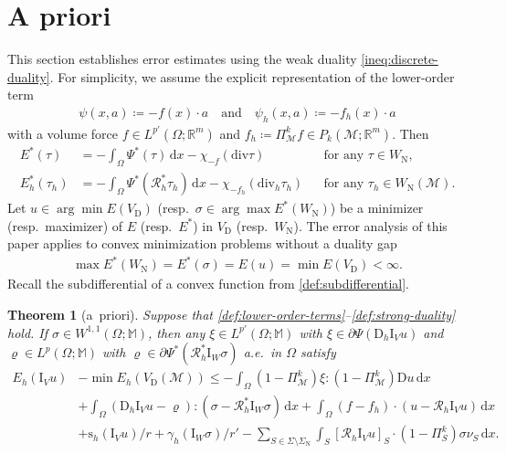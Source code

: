 \documentclass[a4paper]{amsart}
\numberwithin{equation}{section}
\newcommand{\R}{\mathbb{R}}
\renewcommand{\d}[1]{\,\mathrm{d}#1}
\renewcommand{\div}{\mathrm{div}}
\newcommand{\I}{\mathrm{I}}
\newcommand{\Mcal}{\mathcal{M}}
\newcommand{\D}{\mathrm{D}}
\newcommand{\s}{\mathrm{s}}
\newcommand{\M}{\mathbb{M}}
\newtheorem{theorem}{Theorem}[section]
\theoremstyle{remark}
\begin{document}
\section{A priori}\label{sec:a-priori}
This section establishes error estimates using the weak duality \eqref{ineq:discrete-duality}.
For simplicity, we assume the explicit representation of the lower-order term
\begin{align}\label{def:lower-order-terms}
	\psi(x,a) \coloneqq -f(x) \cdot a \quad\text{and}\quad \psi_h(x,a) \coloneqq -f_h(x)\cdot a
\end{align}
with a volume force $f \in L^{p'}(\Omega;\R^m)$ and $f_h \coloneqq \Pi_\Mcal^k f \in P_k(\Mcal;\R^m)$.
Then
\begin{align*}
	E^*(\tau) &= -\int_\Omega \Psi^*(\tau) \d{x} - \chi_{-f} (\div \tau) &&\text{for any } \tau \in W_\mathrm{N},\\
	E_h^*(\tau_h) &= -\int_\Omega \Psi^*(\mathcal{R}^*_h \tau_h) \d{x} - \chi_{-f_h}(\div_h \tau_h) &&\text{for any } \tau_h \in W_\mathrm{N}(\Mcal).
\end{align*}
Let $u \in \arg\min E(V_\mathrm{D})$ (resp.~$\sigma \in \arg\max E^*(W_\mathrm{N})$) be a minimizer (resp.~maximizer) of $E$ (resp.~$E^*$) in $V_\mathrm{D}$ (resp.~$W_\mathrm{N}$).
The error analysis of this paper applies to convex minimization problems without a duality gap
\begin{align}\label{def:strong-duality}
	\max E^*(W_\mathrm{N}) = E^*(\sigma) = E(u) = \min E(V_\mathrm{D}) < \infty.
\end{align}
Recall the subdifferential of a convex function from \eqref{def:subdifferential}.
\begin{theorem}[a~priori]\label{thm:error-estimate}
	Suppose that \eqref{def:lower-order-terms}--\eqref{def:strong-duality} hold. If $\sigma \in W^{1,1}(\Omega; \M)$, then any $\xi \in L^{p'}(\Omega; \M)$ with
	$\xi \in \partial \Psi(\D_h \I_V u)$ and $\varrho \in L^p(\Omega; \M)$ with $\varrho \in \partial \Psi^*(\mathcal{R}_h^* \I_W \sigma)$ a.e.~in $\Omega$ satisfy
	\begin{align}\label{ineq:error-estimate}
		E_h(\I_V u) &- \min E_h(V_\mathrm{D}(\Mcal)) \leq -\int_\Omega (1 - \Pi_\Mcal^k) \xi:(1 - \Pi_\Mcal^k) \D u \d{x}\nonumber\\
		& + \int_\Omega (\D_h \I_V u - \varrho) : (\sigma - \mathcal{R}_h^* \I_W \sigma) \d{x} + \int_\Omega (f - f_h) \cdot (u - \mathcal{R}_h \I_V u) \d{x}\nonumber\\
		& + \s_h(\I_V u)/r + \gamma_h(\I_W \sigma)/r' - \sum_{S \in \Sigma \setminus \Sigma_\mathrm{N}} \int_S [\mathcal{R}_h \I_V u]_S \cdot (1 - \Pi_S^k)\sigma \nu_S \d{x}.
	\end{align}
\end{theorem}
\end{document}
